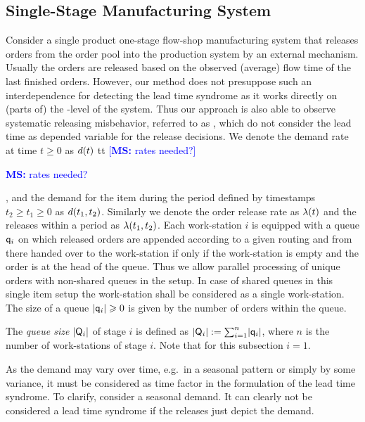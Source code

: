 \documentclass[mnsc]{informs3}
\newcommand\MS[2][r]{\ifx t#1 \textcolor{blue}{[\textbf{MS:} #2]}
  \else \begin{center}\textcolor{blue}{\textbf{MS:} #2} \end{center} \fi}
\begin{document}
\subsection{Single-Stage Manufacturing System}
\label{subsec:Single-Stage_Manufacturing_System}


Consider a single product one-stage flow-shop manufacturing system that releases orders from the
order pool into the production system by an external mechanism.
%
Usually the orders are released based on the observed (average) flow time of the last finished
orders. However, our method does not presuppose such an interdependence for detecting the lead time
syndrome as it works directly on (parts of) the \WIP{}-level of the system. Thus our approach is
also able to observe systematic releasing misbehavior, referred to as \LTS{}, which do not consider
the lead time as depended variable for the release decisions.
%
%
We denote the demand rate at time $t \geqslant 0$ as ${d}(t)$ \MS[t]{rates needed?}, and the demand
for the item during the period defined by timestamps $t_{2} \geqslant t_{1} \geqslant 0$ as
${d}(t_{1},t_{2})$. Similarly we denote the order release rate as ${\lambda} (t)$ and the releases within
a period as ${\lambda} (t_{1},t_{2})$. Each work-station $i$ is equipped with a queue $\mathsf{q}_{i}$ on which
released orders are appended according to a given routing and from there handed over to the
work-station if only if the work-station is empty and the order is at the head of the queue. Thus we
allow parallel processing of unique orders with non-shared queues in the setup. In case of shared
queues in this single item setup the work-station shall be considered as a single work-station. The
size of a queue $\lvert{\mathsf{q}_{i}}\rvert \geqslant 0$ is given by the number of orders within the queue.


\begin{definition}

  The \emph{queue size} $\lvert{\mathsf{Q}_{i}}\rvert$ of stage $i$ is defined as
  $\lvert{\mathsf{Q}_{i}}\rvert \mathrel{:=} \sum_{i=1}^{n} \lvert{\mathsf{q}_{i}}\rvert$, where $n$ is the number of work-stations of stage
  $i$. Note that for this subsection $i=1$.

\end{definition}


As the demand may vary over time, e.g.~in a seasonal pattern or simply by some variance, it must be
considered as time factor in the formulation of the lead time syndrome. To clarify, consider a
seasonal demand. It can clearly not be considered a lead time syndrome if the releases just depict
the demand.
\end{document}
